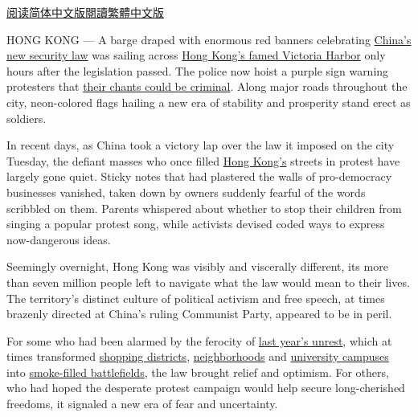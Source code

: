 \href{https://cn.nytimes3xbfgragh.onion/china/20200706/hong-kong-security-law/}{阅读简体中文版}\href{https://cn.nytimes3xbfgragh.onion/china/20200706/hong-kong-security-law/zh-hant/}{閱讀繁體中文版}

HONG KONG --- A barge draped with enormous red banners celebrating
\href{https://www.nytimes3xbfgragh.onion/2020/07/13/world/asia/hong-kong-elections-security.html}{China's
new security law} was sailing across
\href{https://www.nytimes3xbfgragh.onion/2020/07/13/podcasts/the-daily/hong-kong.html}{Hong
Kong's famed Victoria Harbor} only hours after the legislation passed.
The police now hoist a purple sign warning protesters that
\href{https://www.nytimes3xbfgragh.onion/2020/07/01/world/asia/hong-kong-purple-flag.html}{their
chants could be criminal}. Along major roads throughout the city,
neon-colored flags hailing a new era of stability and prosperity stand
erect as soldiers.

In recent days, as China took a victory lap over the law it imposed on
the city Tuesday, the defiant masses who once filled
\href{https://www.nytimes3xbfgragh.onion/2020/07/13/world/asia/hong-kong-elections-security.html}{Hong
Kong's} streets in protest have largely gone quiet. Sticky notes that
had plastered the walls of pro-democracy businesses vanished, taken down
by owners suddenly fearful of the words scribbled on them. Parents
whispered about whether to stop their children from singing a popular
protest song, while activists devised coded ways to express
now-dangerous ideas.

Seemingly overnight, Hong Kong was visibly and viscerally different, its
more than seven million people left to navigate what the law would mean
to their lives. The territory's distinct culture of political activism
and free speech, at times brazenly directed at China's ruling Communist
Party, appeared to be in peril.

For some who had been alarmed by the ferocity of
\href{https://www.nytimes3xbfgragh.onion/news-event/hong-kong-protests}{last
year's unrest}, which at times transformed
\href{https://www.nytimes3xbfgragh.onion/2019/08/04/world/asia/hong-kong-protests.html}{shopping
districts},
\href{https://www.nytimes3xbfgragh.onion/2019/08/24/world/asia/hong-kong-protests.html}{neighborhoods}
and
\href{https://www.nytimes3xbfgragh.onion/2019/11/13/world/asia/hong-kong-protests-students.html}{university
campuses} into
\href{https://www.nytimes3xbfgragh.onion/interactive/2019/11/18/world/asia/hong-kong-protest-universities.html}{smoke-filled
battlefields}, the law brought relief and optimism. For others, who had
hoped the desperate protest campaign would help secure long-cherished
freedoms, it signaled a new era of fear and uncertainty.

